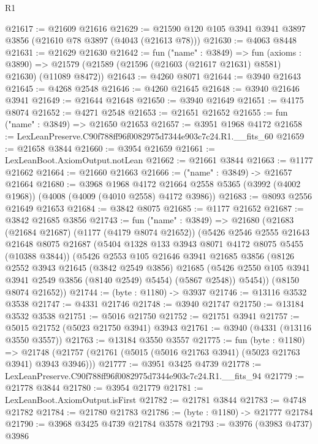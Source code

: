 \begin{lexlean}{R1}
\begin{coremodule}
@21617 := @21609 @21616
@21629 := @21590 @120 @105 @3941 @3941 @3897 @3856 (@21610 @78 @3897 (@4043 (@21613 @78)))
@21630 := @4063 @8448
@21631 := @21629 @21630
@21642 := fun ("name" : @3849) =>
  fun (axioms : @3890) =>
  @21579 (@21589 (@21596 (@21603 (@21617 @21631) @8581) @21630) (@11089 @8472))
@21643 := @4260 @8071
@21644 := @3940 @21643
@21645 := @4268 @2548
@21646 := @4260 @21645
@21648 := @3940 @21646 @3941
@21649 := @21644 @21648
@21650 := @3940 @21649
@21651 := @4175 @8074
@21652 := @4271 @2548
@21653 := @21651 @21652
@21655 := fun ("name" : @3849) => @21650 @21653
@21657 := @3951 @1968 @4172
@21658 := LexLeanPreserve.C90f788ff96f0082975d7344e903c7c24.R1.__fits_60
@21659 := @21658 @3844
@21660 := @3954 @21659
@21661 := LexLeanBoot.AxiomOutput.notLean
@21662 := @21661 @3844
@21663 := @1177 @21662
@21664 := @21660 @21663
@21666 := ("name" : @3849) -> @21657 @21664
@21680 := @3968
    @1968
    @4172
    @21664
    @2558
    @5365
    (@3992 (@4002 @1968))
    (@4008 (@4009 (@4010 @2558) @4172 @3986))
@21683 := @8093 @2556 @21649 @21653
@21684 := @3842 @8075
@21685 := @1177 @21652
@21687 := @3842 @21685 @3856
@21743 := fun ("name" : @3849) =>
  @21680
    (@21683
      (@21684 @21687)
      (@1177 (@4179 @8074 @21652))
      (@5426
        @2546
        @2555
        @21643
        @21648
        @8075
        @21687
        (@5404 @1328 @133 @3943 @8071 @4172 @8075 @5455 (@10388 @3844))
        (@5426
          @2553
          @105
          @21646
          @3941
          @21685
          @3856
          (@8126
            @2552
            @3943
            @21645
            (@3842 @2549 @3856)
            @21685
            (@5426 @2550 @105 @3941 @3941 @2549 @3856 (@8140 @2549) @5454)
            (@5867 @2548))
          @5454))
      (@8150 @8074 @21652))
@21744 := (byte : @1180) -> @3937
@21746 := @13116 @3532 @3538
@21747 := @4331 @21746
@21748 := @3940 @21747
@21750 := @13184 @3532 @3538
@21751 := @5016 @21750
@21752 := @21751 @3941
@21757 := @5015 @21752 (@5023 @21750 @3941) @3943
@21761 := @3940 (@4331 (@13116 @3550 @3557))
@21763 := @13184 @3550 @3557
@21775 := fun (byte : @1180) =>
  @21748 (@21757 (@21761 (@5015 (@5016 @21763 @3941) (@5023 @21763 @3941) @3943 @3946)))
@21777 := @3951 @3425 @4739
@21778 := LexLeanPreserve.C90f788ff96f0082975d7344e903c7c24.R1.__fits_94
@21779 := @21778 @3844
@21780 := @3954 @21779
@21781 := LexLeanBoot.AxiomOutput.isFirst
@21782 := @21781 @3844
@21783 := @4748 @21782
@21784 := @21780 @21783
@21786 := (byte : @1180) -> @21777 @21784
@21790 := @3968 @3425 @4739 @21784 @3578
@21793 := @3976 (@3983 @4737) @3986

\end{coremodule}
\end{lexlean}
